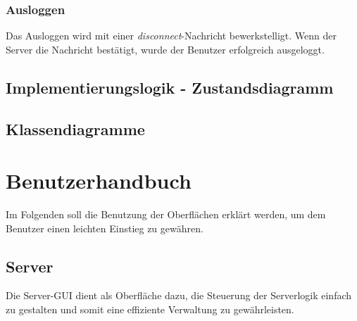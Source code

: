\documentclass[12pt,a4paper,bibliography=totocnumbered,listof=totocnumbered]{scrartcl}
\begin{document}


\subsubsection{Ausloggen}
Das Ausloggen wird mit einer \textit{disconnect}-Nachricht bewerkstelligt. Wenn der Server die Nachricht bestätigt, wurde der Benutzer erfolgreich ausgeloggt.




\subsection{Implementierungslogik - Zustandsdiagramm}

\subsection{Klassendiagramme}


\newpage
\section{Benutzerhandbuch}
Im Folgenden soll die Benutzung der Oberflächen erklärt werden, um dem Benutzer einen leichten Einstieg zu gewähren.
\subsection{Server}
Die Server-GUI dient als Oberfläche dazu, die Steuerung der Serverlogik einfach zu gestalten und somit eine effiziente Verwaltung zu gewährleisten.
\end{document}
